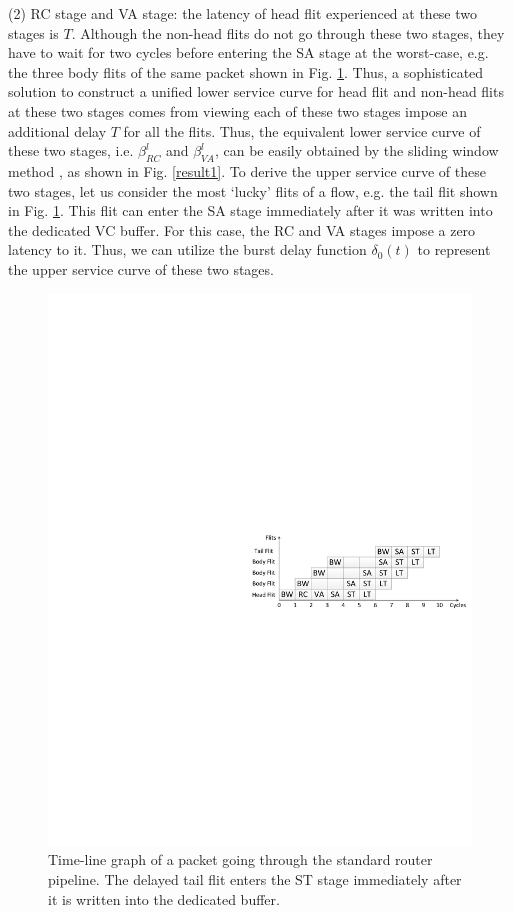 \documentclass[preprint]{elsarticle}
\begin{document}
(2) RC stage and VA stage: the latency of head flit experienced at these two stages is $T$. Although the non-head flits do not go through these two stages, they have to wait for two cycles before entering the SA stage at the worst-case, e.g. the three body flits of the same packet shown in Fig. \ref{pipeline}. Thus, a sophisticated solution to construct a unified lower service curve for head flit and non-head flits at these two stages comes from viewing each of these two stages impose an additional delay $T$ for all the flits. Thus, the equivalent lower service curve of these two stages, i.e. $\beta^l_{RC}$ and $\beta^l_{VA}$, can be easily obtained by the sliding window method \cite{1253607}, as shown in Fig. \ref{result1}. To derive the upper service curve of these two stages, let us consider the most `lucky' flits of a flow, e.g. the tail flit shown in Fig. \ref{pipeline}. This flit can enter the SA stage immediately after it was written into the dedicated VC buffer. For this case, the RC and VA stages impose a zero latency to it. Thus, we can utilize the burst delay function $\delta_0(t)$ to represent the upper service curve of these two stages.
\begin{figure}
  \centering
  \includegraphics[scale=0.35]{figures/Pipeline.pdf}
  \caption{Time-line graph of a packet going through the standard router pipeline. The delayed tail flit enters the ST stage immediately after it is written into the dedicated buffer.}\label{pipeline}
\end{figure}
\end{document}
